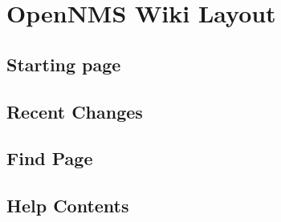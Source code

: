\section{OpenNMS Wiki Layout}
\subsection{Starting page}
\subsection{Recent Changes}
\subsection{Find Page}
\subsection{Help Contents}



